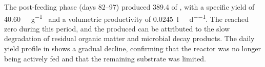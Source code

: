 \documentclass[12pt, a4paper, oneside]{report}
\begin{document}
The post-feeding phase (days \numrange[parse-numbers=false]{82}{97}) produced \qty{389.4}{\nml} of , with a specific yield of \qty{40.60}{\nml\CH\per\gram\VSfed} and a volumetric productivity of \qty{0.0245}{\litre\CH\per\reactorlitre\per\day}. The  reached zero during this period, and the  produced can be attributed to the slow degradation of residual organic matter and microbial decay products. The daily yield profile in  shows a gradual decline, confirming that the reactor was no longer being actively fed and that the remaining substrate was limited.

\begingroup


\end{document}
